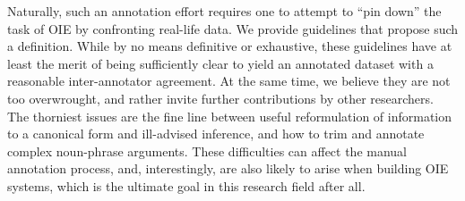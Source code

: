 \pdfoutput=1 \documentclass[11pt, a4paper]{article}
\begin{document}
Naturally, such an annotation effort requires one to attempt to ``pin down'' the task of OIE by confronting real-life data. We provide guidelines that propose such a definition. While by no means definitive or exhaustive, these guidelines have at least the merit of being sufficiently clear to yield an annotated dataset with a reasonable inter-annotator agreement. At the same time, we believe they are not too overwrought, and rather invite further contributions by other researchers. The thorniest issues are the fine line between useful reformulation of information to a canonical form and ill-advised inference, and how to trim and annotate complex noun-phrase arguments. These difficulties can affect the manual annotation process, and, interestingly, are also likely to arise when building OIE systems, which is the ultimate goal in this research field after all.


{}
\end{document}

